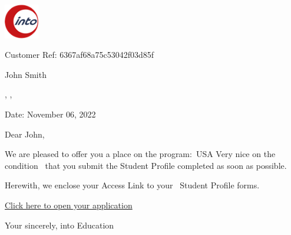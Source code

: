 \documentclass{article}
\begin{document}
\noindent\includegraphics[width=1.5cm]{../logo.png}\par\vspace{1cm}\noindent Customer Ref: 6367af68a75c53042f03d85f\par\medskip\noindent John Smith\par\noindent , , \par\medskip\noindent Date: November 06, 2022\par\vspace{1cm}\noindent Dear John,\par\smallskip \noindent We are pleased to offer you a place on the program:\
         USA Very nice on the condition \
         that you submit the Student Profile completed as soon as possible.\par\smallskip \noindent Herewith, we enclose your Access Link to your \
        Student Profile forms.\par\smallskip \noindent \href{http://localhost:3000/application?id=6367af68a75c53042f03d85f}{Click here to open your application} \par\smallskip \noindent Your sincerely, into Education
\end{document}
